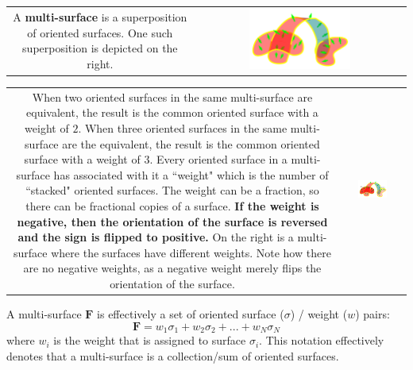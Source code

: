 \documentclass{book}
\begin{document}
\begin{tabular}{cc}
\parbox{0.5\textwidth}{
A \textbf{multi-surface} is a superposition of oriented surfaces. One such superposition is depicted on the right.
} & \parbox{0.5\textwidth}{
\includegraphics[width = 0.5\textwidth]{Multi-structures/Multisurfaces/multi-surface_simple}
}
\end{tabular}

\begin{tabular}{cc}
\parbox{0.5\textwidth}{
When two oriented surfaces in the same multi-surface are equivalent, the result is the common oriented surface with a weight of \(2\). When three oriented surfaces in the same multi-surface are the equivalent, the result is the common oriented surface with a weight of \(3\). Every oriented surface in a multi-surface has associated with it a ``weight" which is the number of ``stacked" oriented surfaces. The weight can be a fraction, so there can be fractional copies of a surface. {\bf If the weight is negative, then the orientation of the surface is reversed and the sign is flipped to positive.} On the right is a multi-surface where the surfaces have different weights. Note how there are no negative weights, as a negative weight merely flips the orientation of the surface.  
} & \parbox{0.5\textwidth}{
\includegraphics[width = 0.5\textwidth]{Multi-structures/Multisurfaces/multi-surface_multiplicity}
}
\end{tabular}

\vspace{2mm}

A multi-surface \(\mathbf{F}\) is effectively a set of oriented surface (\(\sigma\)) / weight (\(w\)) pairs:
\[\mathbf{F} = w_1 \sigma_1 + w_2 \sigma_2 + ... + w_N \sigma_N\]
where \(w_i\) is the weight that is assigned to surface \(\sigma_i\). This notation effectively denotes that a multi-surface is a collection/sum of oriented surfaces.
\end{document}
